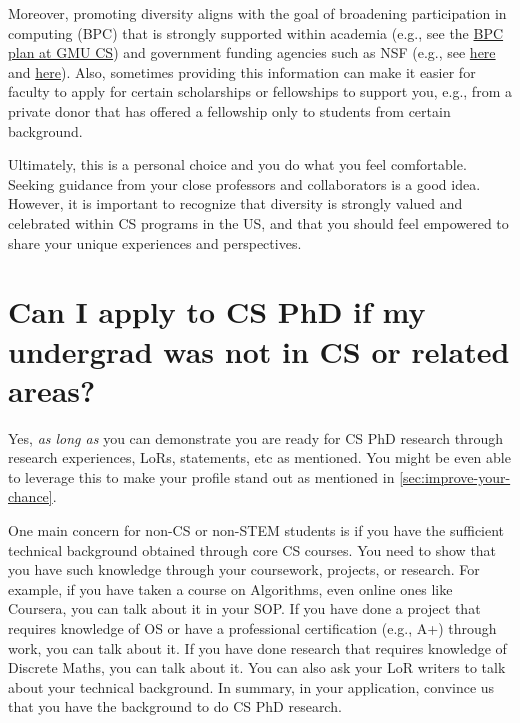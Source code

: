 \documentclass[oneside,11pt]{book}
\begin{document}
Moreover, promoting diversity aligns with the goal of broadening participation in computing (BPC) that is strongly supported within academia (e.g., see the \href{https://plans.bpcnet.org/GeorgeMasonUniversity_ComputerScience_DepartmentalBPCPlan.pdf}{BPC plan at GMU CS}) and government funding agencies such as NSF (e.g., see \href{https://new.nsf.gov/cise/broadening-participation}{here} and \href{https://www.nsf.gov/pubs/2022/nsf22125/nsf22125.jsp}{here}). 
Also, sometimes providing this information can make it easier for faculty to apply for certain scholarships or fellowships to support you, e.g., from a private donor that has offered a fellowship only to students from certain background.

Ultimately, this is a personal choice and you do what you feel comfortable. Seeking guidance from your close professors and collaborators is a good idea. However, it is important to recognize that diversity is strongly valued and celebrated within CS programs in the US, and that you should feel empowered to share your unique experiences and perspectives.






\section{Can I apply to CS PhD if my undergrad was not in CS or related areas?}\label{sec:non-stem}

Yes, \emph{as long as} you can demonstrate you are ready for CS PhD research through research experiences, LoRs, statements, etc as mentioned. You might be even able to leverage this to make your profile stand out as mentioned in \autoref{sec:improve-your-chance}.

One main concern for non-CS or non-STEM students is if you have the sufficient technical background obtained through core CS courses.  You need to show that you have such knowledge through your coursework, projects, or research.
For example, if you have taken a course on Algorithms, even online ones like Coursera, you can talk about it in your SOP.  If you have done a project that requires knowledge of OS or have a professional certification (e.g., A+) through work, you can talk about it.  If you have done research that requires knowledge of Discrete Maths, you can talk about it.  You can also ask your LoR writers to talk about your technical background.  
In summary, in your application, convince us that you have the background to do CS PhD research. 
\end{document}
